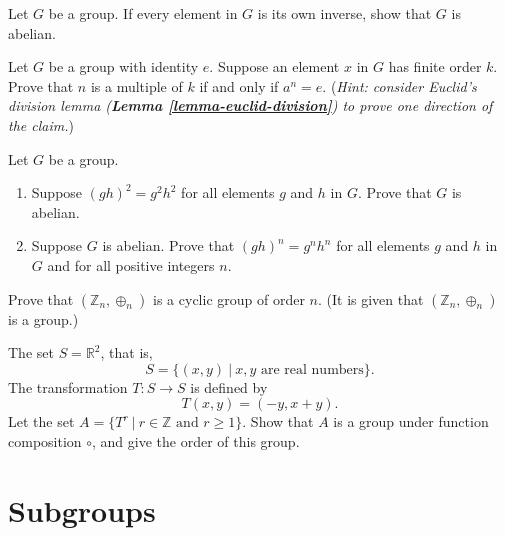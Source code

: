 \begin{problem}
    Let $G$ be a group. If every element in $G$ is its own inverse, show that $G$ is abelian.
\end{problem}

\begin{problem}\label{problem-element-to-power-of-multiple-of-order-is-identity}
    Let $G$ be a group with identity $e$. Suppose an element $x$ in $G$ has finite order $k$. Prove that $n$ is a multiple of $k$ if and only if $a^n = e$.\newline
    (\textit{Hint: consider Euclid's division lemma (\textbf{Lemma \ref{lemma-euclid-division}}) to prove one direction of the claim.})
\end{problem}

\begin{problem}
    Let $G$ be a group.
    \begin{enumerate}[label=(\alph*)]
        \item Suppose $(gh)^2 = g^2h^2$ for all elements $g$ and $h$ in $G$. Prove that $G$ is abelian.
        \item Suppose $G$ is abelian. Prove that $(gh)^n = g^nh^n$ for all elements $g$ and $h$ in $G$ and for all positive integers $n$.
    \end{enumerate}
\end{problem}

\begin{problem}
    Prove that $(\mathbb{Z}_n, \oplus_n)$ is a cyclic group of order $n$. (It is given that $(\mathbb{Z}_n, \oplus_n)$ is a group.)
\end{problem}

\begin{problem}
    The set $S = \mathbb{R}^2$, that is,
    \[
        S = \{(x, y) \ | \ x, y \text{ are real numbers}\}.
    \]
    The transformation $T: S \to S$ is defined by
    \[
        T(x, y) = (-y, x+y).
    \]
    Let the set $A = \{T^r \ | \ r \in \mathbb{Z} \text{ and } r \geq 1\}$. Show that $A$ is a group under function composition $\circ$, and give the order of this group.
\end{problem}

\chapter{Subgroups}
